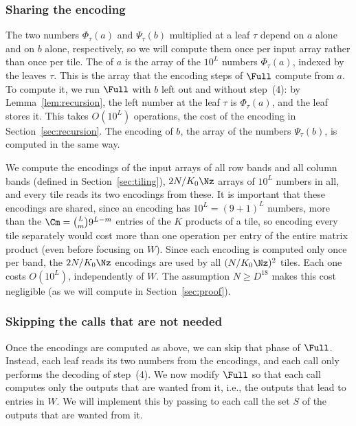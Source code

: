 \subsubsection{Sharing the encoding}\label{sec:encoders}

The two numbers $\Phi_\tau(a)$ and $\Psi_\tau(b)$ multiplied at a leaf $\tau$ depend on $a$ alone and on $b$ alone, respectively, so we will compute them once per input array rather than once per tile. The  of $a$ is the array of the $10^L$ numbers $\Phi_\tau(a)$, indexed by the leaves $\tau$. This is the array that the encoding steps of $\Full$ compute from $a$. To compute it, we run $\Full$ with $b$ left out and without step~(4): by Lemma~\ref{lem:recursion}, the left number at the leaf $\tau$ is $\Phi_\tau(a)$, and the leaf stores it. This takes $O(10^L)$ operations, the cost of the encoding in Section~\ref{sec:recursion}. The encoding of $b$, the array of the numbers $\Psi_\tau(b)$, is computed in the same way.

We compute the encodings of the input arrays of all row bands and all column bands (defined in Section~\ref{sec:tiling}), $2N/K_0\Nz$ arrays of $10^L$ numbers in all, and every tile reads its two encodings from these. It is important that these encodings are shared, since an encoding has $10^L=(9+1)^L$ numbers, more than the $\Cm=\binom Lm9^{L-m}$ entries of the $K$ products of a tile, so encoding every tile separately would cost more than one operation per entry of the entire matrix product (even before focusing on $W$). Since each encoding is computed only once per band, the $2N/K_0\Nz$ encodings are used by all $(N/K_0\Nz)^2$ tiles. Each one costs $O(10^L)$, independently of $W$. The assumption $N\ge D^{18}$ makes this cost negligible (as we will compute in Section~\ref{sec:proof}). %

\subsubsection{Skipping the calls that are not needed}\label{sec:prune}

Once the encodings are computed as above, we can skip that phase of $\Full$. Instead, each leaf reads its two numbers from the encodings, and each call only performs the decoding of step~(4). We now modify $\Full$ so that each call computes only the outputs that are wanted from it, i.e., the outputs that lead to entries in $W$. We will implement this by passing to each call the set $S$ of the outputs that are wanted from it.

